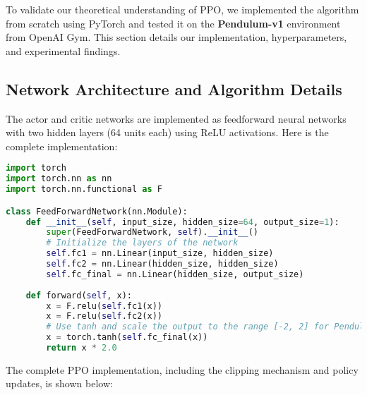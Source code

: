\documentclass[12pt]{extreport} %
\begin{document}
To validate our theoretical understanding of PPO, we implemented the algorithm from scratch using PyTorch and tested it on the \textbf{Pendulum-v1} environment from OpenAI Gym. This section details our implementation, hyperparameters, and experimental findings.

\subsection{\textbf{Network Architecture and Algorithm Details}}
The actor and critic networks are implemented as feedforward neural networks with two hidden layers (64 units each) using ReLU activations. Here is the complete implementation:

\begin{lstlisting}[language=Python, caption={Network Architecture (network.py)}, label={code:network}]
import torch
import torch.nn as nn
import torch.nn.functional as F

class FeedForwardNetwork(nn.Module):
    def __init__(self, input_size, hidden_size=64, output_size=1):
        super(FeedForwardNetwork, self).__init__()
        # Initialize the layers of the network
        self.fc1 = nn.Linear(input_size, hidden_size)
        self.fc2 = nn.Linear(hidden_size, hidden_size)
        self.fc_final = nn.Linear(hidden_size, output_size)
    
    def forward(self, x):
        x = F.relu(self.fc1(x))
        x = F.relu(self.fc2(x))
        # Use tanh and scale the output to the range [-2, 2] for Pendulum
        x = torch.tanh(self.fc_final(x))
        return x * 2.0
\end{lstlisting}

The complete PPO implementation, including the clipping mechanism and policy updates, is shown below:
\end{document}
